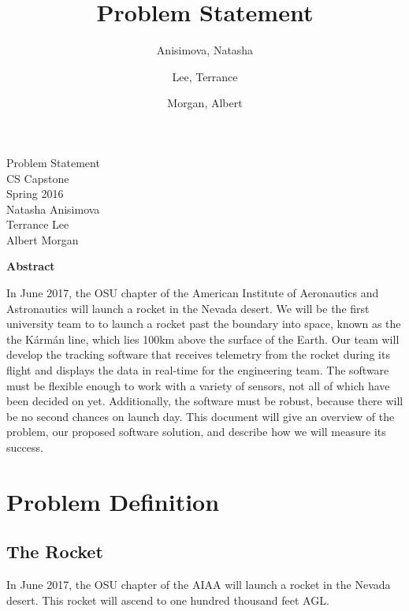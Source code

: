 \documentclass[10pt,journal,draftclsnofoot,onecolumn]{IEEEtran}
\begin{document}
\singlespace

\title{\vspace{2in}Problem Statement}

\author {
	Anisimova, Natasha
	\and
	Lee, Terrance
	\and
	Morgan, Albert
}


\pagestyle{empty}
\vspace*{2in}
\begin{center}
\huge
Problem Statement\\
\normalsize
\vspace{5mm}
CS Capstone\\
Spring 2016\\
\vspace{5mm}
Natasha Anisimova\\
Terrance Lee\\
Albert Morgan
\end{center}

\vspace{5mm}

\begin{center}
\textbf{Abstract}
\end{center}

\begin{adjustwidth}{2in}{2in}
In June 2017, the \ac{OSU} chapter of the
American Institute of Aeronautics and Astronautics will launch a rocket in the Nevada desert.
We will be the first university team to to launch a rocket past the boundary into space,
known as the the K\'{a}rm\'{a}n line, which lies 100km above the surface of the Earth.
Our team will develop the tracking software that receives
telemetry from the rocket during its flight
and displays the data in real-time for the engineering team.
The software must be flexible enough to work with a variety of sensors,
not all of which have been decided on yet.
Additionally, the software must be robust,
because there will be no second chances on launch day.
This document will give an overview of the problem,
our proposed software solution,
and describe how we will measure its success.
\end{adjustwidth}

\newpage
\pagestyle{headings}
\section{Problem Definition}
\subsection{The Rocket}
In June 2017, the \ac{OSU} chapter of the
\ac{AIAA} will launch a rocket in the Nevada desert.
This rocket will ascend to one hundred thousand feet \ac{AGL}.
\end{document}
